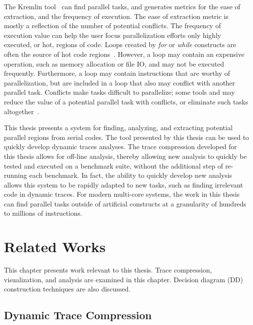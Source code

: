 \documentclass[defaultstyle,11pt]{thesis}
\begin{document}
The Kremlin tool~\cite{garcia:2011:pldi} can find parallel tasks, and
generates metrics for the ease of extraction, and the frequency of
execution.  The ease of extraction metric is mostly a reflection of
the number of potential conflicts.  The frequency of execution value
can help the user focus parallelization efforts only highly
executed, or hot, regions of code.  Loops created by \textit{for} or
\textit{while} constructs are often the source of hot code
regions~\cite{bala:2000:pldi}.  However, a loop may contain an
expensive operation, such as memory allocation or file IO, and may not
be executed frequently.  Furthermore, a loop may contain instructions
that are worthy of parallelization, but are included in a loop that
also may conflict with another parallel task.  Conflicts make tasks
difficult to parallelize; some tools and may reduce the value of a
potential parallel task with conflicts, or eliminate such tasks
altogether~\cite{garcia:2011:pldi}.

This thesis presents a system for finding, analyzing, and extracting
potential parallel regions from serial codes.  The tool presented by
this thesis can be used to quickly develop dynamic traces analyses.
The trace compression developed for this thesis allows for off-line
analysis, thereby allowing new analysis to quickly be tested and
executed on a benchmark suite, without the additional step of
re-running each benchmark.  In fact, the ability to quickly develop new
analysis allows this system to be rapidly adapted to new tasks, such
as finding irrelevant code in dynamic traces.  For modern multi-core
systems, the work in this thesis can find parallel tasks outside of
artificial constructs at a granularity of hundreds to millions of
instructions.

\chapter{Related Works}
\label{chap:background}

This chapter presents work relevant to this thesis.  Trace
compression, visualization, and analysis are examined in this chapter.
Decision diagram (DD) construction techniques are also discussed.

\section{Dynamic Trace Compression}
\end{document}
